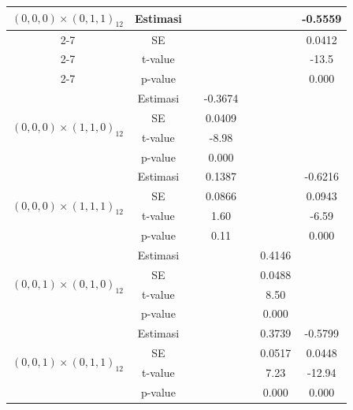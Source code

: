\begin{enumerate}[label=\alph*.]
\begin{longtable}{|c|c|c|c|c|c|c|}
            \multirow{4}{*}{$(0,0,0)\times(0,1,1)_{12}$}
            & Estimasi &  &  &  &  & -0.5559 \\ \cline{2-7}
            & SE       &  &  &  &  & 0.0412  \\ \cline{2-7}
            & t-value  &  &  &  &  & -13.5  \\ \cline{2-7}
            & p-value  &  &  &  &  & 0.000  \\ \hline

            \multirow{4}{*}{$(0,0,0)\times(1,1,0)_{12}$}
            & Estimasi &  & -0.3674 &  &  &  \\ \cline{2-7}
            & SE       &  & 0.0409  &  &  &  \\ \cline{2-7}
            & t-value  &  & -8.98   &  &  &  \\ \cline{2-7}
            & p-value  &  & 0.000   &  &  &  \\ \hline

            \multirow{4}{*}{$(0,0,0)\times(1,1,1)_{12}$}
            & Estimasi &  & 0.1387 &  &  & -0.6216 \\ \cline{2-7}
            & SE       &  & 0.0866 &  &  & 0.0943  \\ \cline{2-7}
            & t-value  &  & 1.60   &  &  & -6.59  \\ \cline{2-7}
            & p-value  &  & 0.11   &  &  & 0.000  \\ \hline

            \multirow{4}{*}{$(0,0,1)\times(0,1,0)_{12}$}
            & Estimasi &  &  &  & 0.4146 &  \\ \cline{2-7}
            & SE       &  &  &  & 0.0488 &  \\ \cline{2-7}
            & t-value  &  &  &  & 8.50   &  \\ \cline{2-7}
            & p-value  &  &  &  & 0.000  &  \\ \hline

            \multirow{4}{*}{$(0,0,1)\times(0,1,1)_{12}$}
            & Estimasi &  &  &  & 0.3739 & -0.5799 \\ \cline{2-7}
            & SE       &  &  &  & 0.0517 & 0.0448  \\ \cline{2-7}
            & t-value  &  &  &  & 7.23   & -12.94 \\ \cline{2-7}
            & p-value  &  &  &  & 0.000  & 0.000  \\ \hline


\end{longtable}
\end{enumerate}
